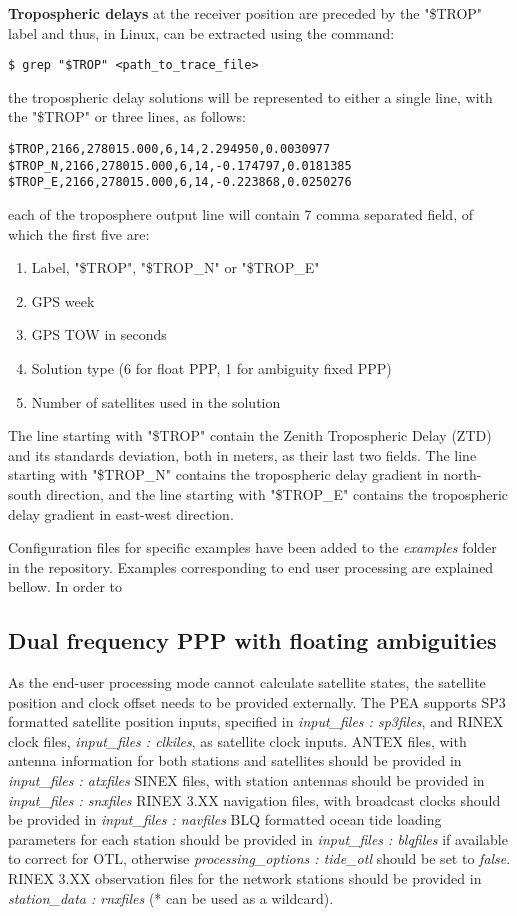 \textbf{Tropospheric delays} at the receiver position are preceded by the "\$TROP" label and thus, in Linux, can be extracted using the command:
 \begin{lstlisting}
$ grep "$TROP" <path_to_trace_file>
\end{lstlisting}
the tropospheric delay solutions will be represented to either a single line, with the "\$TROP" or three lines, as follows:
\begin{lstlisting}
$TROP,2166,278015.000,6,14,2.294950,0.0030977
$TROP_N,2166,278015.000,6,14,-0.174797,0.0181385
$TROP_E,2166,278015.000,6,14,-0.223868,0.0250276
\end{lstlisting}
each of the troposphere output line will contain 7 comma separated field, of which the first five are:
\begin{enumerate}
	\item  Label, "\$TROP", "\$TROP\_N" or "\$TROP\_E"
	\item  GPS week
	\item  GPS TOW in seconds
	\item  Solution type (6 for float PPP, 1 for ambiguity fixed PPP)
	\item  Number of satellites used in the solution
\end{enumerate}
The line starting with "\$TROP" contain the Zenith Tropospheric Delay (ZTD) and its standards deviation, both in meters, as their last two fields.  The line starting with "\$TROP\_N" contains the tropospheric delay gradient in north-south direction, and  the line starting with "\$TROP\_E" contains the tropospheric delay gradient in east-west direction.

Configuration files for specific examples have been added to the \textit{examples} folder in the repository. Examples corresponding to end user processing are explained bellow. In order to 

\subsection{Dual frequency PPP with floating ambiguities}
As the end-user processing mode cannot calculate satellite states, the satellite position and clock offset needs to be provided externally.
The PEA supports SP3 formatted satellite position inputs, specified in \textit{input\_files : sp3files}, and RINEX clock files, \textit{input\_files : clkiles}, as satellite clock inputs. 
ANTEX files, with antenna information for both stations and satellites should be provided in  \textit{input\_files : atxfiles} 
SINEX files, with station antennas should be provided in  \textit{input\_files : snxfiles}
RINEX 3.XX navigation files, with broadcast clocks should be provided in  \textit{input\_files : navfiles}
BLQ formatted ocean tide  loading parameters for each station should be provided in \textit{input\_files : blqfiles} if available to correct for OTL, otherwise \textit{processing\_options : tide\_otl} should be set to \textit{false}.
RINEX 3.XX observation files for the network stations should be provided in \textit{station\_data : rnxfiles} (* can be used as a wildcard).\\

